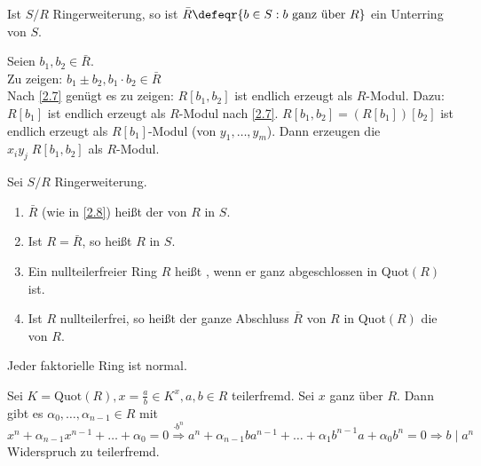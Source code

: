 \begin{Prop}
\label{2.8}
  Ist $S/R$ Ringerweiterung, so ist $\bar{R} \defeqr \{ b \in S: b \mbox{ ganz 
  über } R \}$ ein Unterring von $S$.
\end{Prop}

\begin{Bew} 
  Seien $b_1, b_2 \in \bar{R}$.\\
  Zu zeigen: $b_1 \pm b_2, b_1 \cdot b_2 \in \bar{R}$\\
  Nach \ref{2.7} genügt es zu zeigen: $R[b_1, b_2]$ ist endlich erzeugt als
  $R$-Modul.
  Dazu: $R[b_1]$ ist endlich erzeugt als $R$-Modul nach \ref{2.7}.
  $R[b_1, b_2] = (R[b_1])[b_2]$ ist endlich erzeugt als $R[b_1]$-Modul (von
  $y_1, \dots, y_m$).
  Dann erzeugen die $x_i y_j \; R[b_1, b_2]$ als $R$-Modul.
\end{Bew}

\begin{Def} 
  Sei $S/R$ Ringerweiterung.
  \begin{enumerate} 
    \item $\bar{R}$ (wie in \ref{2.8}) heißt der  von $R$ in $S$.
    \item Ist $R = \bar{R}$, so heißt $R$  in $S$.
    \item Ein nullteilerfreier Ring $R$ heißt , wenn er ganz
          abgeschlossen in Quot$(R)$ ist.
    \item Ist $R$ nullteilerfrei, so heißt der ganze Abschluss $\bar{R}$ von $R$
          in Quot$(R)$ die  von $R$.
  \end{enumerate}
\end{Def}

\begin{Bem}
\label{2.10}
  Jeder faktorielle Ring ist normal.
\end{Bem}

\begin{Bew} 
  Sei $K=\mbox{Quot}(R), x= \frac{a}{b} \in K^x, a,b \in R$ teilerfremd.
  Sei $x$ ganz über $R$. Dann gibt es $\alpha_0, \dots, \alpha_{n-1} \in R$ mit
  $x^n + \alpha_{n-1} x^{n-1} + \dots + \alpha_0 = 0 \overset{\cdot b^n}{\Rightarrow}
  a^n + \alpha_{n-1} b a^{n-1} + \dots + \alpha_1 b^{n-1} a + \alpha_0 b^n = 0
  \Rightarrow b \mid a^n$ Widerspruch zu teilerfremd.
\end{Bew}
